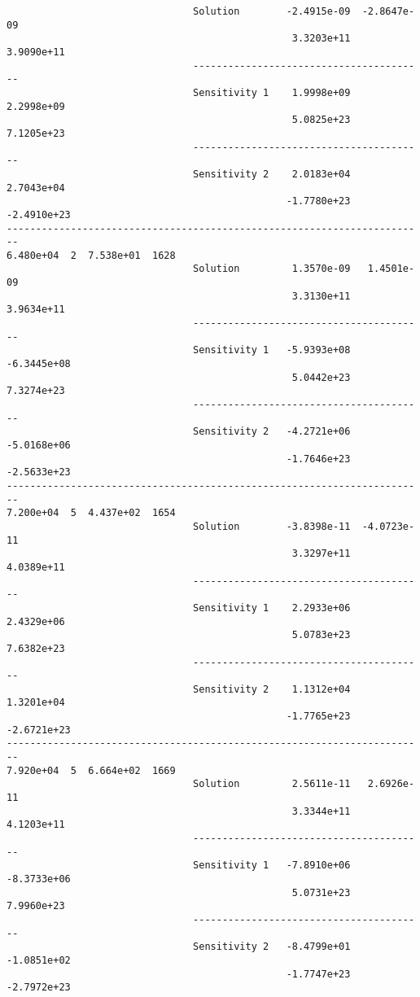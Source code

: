 \begin{verbatim}
                                Solution        -2.4915e-09  -2.8647e-09 
                                                 3.3203e+11   3.9090e+11 
                                ----------------------------------------
                                Sensitivity 1    1.9998e+09   2.2998e+09 
                                                 5.0825e+23   7.1205e+23 
                                ----------------------------------------
                                Sensitivity 2    2.0183e+04   2.7043e+04 
                                                -1.7780e+23  -2.4910e+23 
------------------------------------------------------------------------
6.480e+04  2  7.538e+01  1628
                                Solution         1.3570e-09   1.4501e-09 
                                                 3.3130e+11   3.9634e+11 
                                ----------------------------------------
                                Sensitivity 1   -5.9393e+08  -6.3445e+08 
                                                 5.0442e+23   7.3274e+23 
                                ----------------------------------------
                                Sensitivity 2   -4.2721e+06  -5.0168e+06 
                                                -1.7646e+23  -2.5633e+23 
------------------------------------------------------------------------
7.200e+04  5  4.437e+02  1654
                                Solution        -3.8398e-11  -4.0723e-11 
                                                 3.3297e+11   4.0389e+11 
                                ----------------------------------------
                                Sensitivity 1    2.2933e+06   2.4329e+06 
                                                 5.0783e+23   7.6382e+23 
                                ----------------------------------------
                                Sensitivity 2    1.1312e+04   1.3201e+04 
                                                -1.7765e+23  -2.6721e+23 
------------------------------------------------------------------------
7.920e+04  5  6.664e+02  1669
                                Solution         2.5611e-11   2.6926e-11 
                                                 3.3344e+11   4.1203e+11 
                                ----------------------------------------
                                Sensitivity 1   -7.8910e+06  -8.3733e+06 
                                                 5.0731e+23   7.9960e+23 
                                ----------------------------------------
                                Sensitivity 2   -8.4799e+01  -1.0851e+02 
                                                -1.7747e+23  -2.7972e+23 

\end{verbatim}
